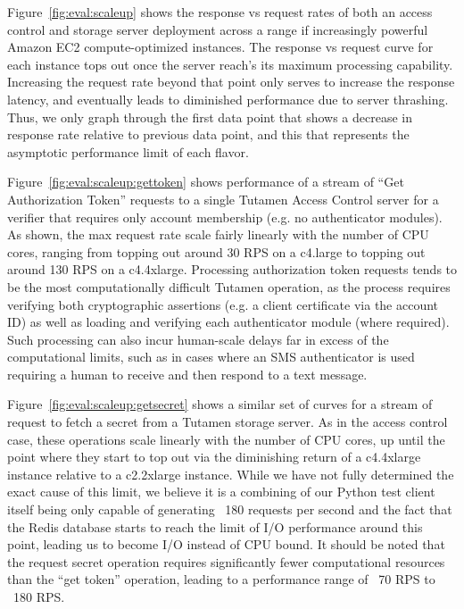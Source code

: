 Figure~\ref{fig:eval:scaleup} shows the response vs request rates of
both an access control and storage server deployment across a range if
increasingly powerful Amazon EC2 compute-optimized instances. The
response vs request curve for each instance tops out once the server
reach's its maximum processing capability. Increasing the request rate
beyond that point only serves to increase the response latency, and
eventually leads to diminished performance due to server
thrashing. Thus, we only graph through the first data point that shows
a decrease in response rate relative to previous data point, and this
that represents the asymptotic performance limit of each flavor.

Figure~\ref{fig:eval:scaleup:gettoken} shows performance of a stream
of ``Get Authorization Token'' requests to a single Tutamen Access
Control server for a verifier that requires only account membership
(e.g. no authenticator modules). As shown, the max request rate scale
fairly linearly with the number of CPU cores, ranging from topping out
around 30 RPS on a c4.large to topping out around 130 RPS on a
c4.4xlarge. Processing authorization token requests tends to be the
most computationally difficult Tutamen operation, as the process
requires verifying both cryptographic assertions (e.g. a client
certificate via the account ID) as well as loading and verifying each
authenticator module (where required). Such processing can also incur
human-scale delays far in excess of the computational limits, such as
in cases where an SMS authenticator is used requiring a human to
receive and then respond to a text message.

Figure~\ref{fig:eval:scaleup:getsecret} shows a similar set of curves
for a stream of request to fetch a secret from a Tutamen storage
server. As in the access control case, these operations scale linearly
with the number of CPU cores, up until the point where they start to
top out via the diminishing return of a c4.4xlarge instance relative
to a c2.2xlarge instance. While we have not fully determined the exact
cause of this limit, we believe it is a combining of our Python test
client itself being only capable of generating ~180 requests per second
and the fact that the Redis database starts to reach the limit of I/O
performance around this point, leading us to become I/O instead of CPU
bound. It should be noted that the request secret operation requires
significantly fewer computational resources than the ``get token'' operation,
leading to a performance range of ~70 RPS to ~180 RPS.

